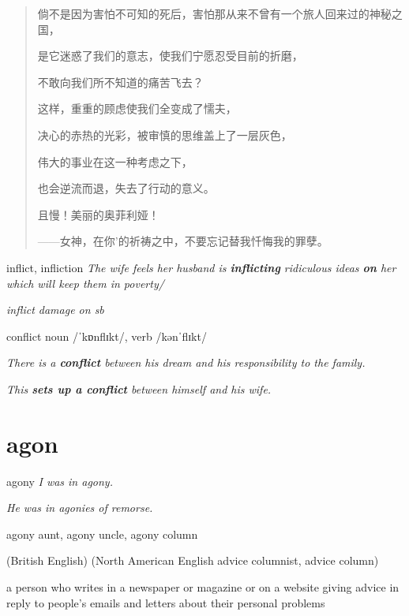 \begin{quotation}
    倘不是因为害怕不可知的死后，害怕那从来不曾有一个旅人回来过的神秘之国，

    是它迷惑了我们的意志，使我们宁愿忍受目前的折磨，

    不敢向我们所不知道的痛苦飞去？

    这样，重重的顾虑使我们全变成了懦夫，

    决心的赤热的光彩，被审慎的思维盖上了一层灰色，

    伟大的事业在这一种考虑之下，

    也会逆流而退，失去了行动的意义。

    且慢！美丽的奥菲利娅！

    ——女神，在你'的祈祷之中，不要忘记替我忏悔我的罪孽。
\end{quotation}

\begin{DefWord}{inflict, infliction}
    \textit{The wife feels her husband is \textbf{inflicting} ridiculous ideas \textbf{on} her which will keep them in poverty/}

    \textit{inflict damage on sb}
\end{DefWord}

\begin{DefWord}{conflict}
    noun /ˈkɒnflɪkt/, verb /kənˈflɪkt/

    \textit{There is a \textbf{conflict} between his dream and his responsibility to the family.}

    \textit{This \textbf{sets up a conflict }between himself and his wife.}
\end{DefWord}


\section{agon}

\begin{DefWord}{agony}
    \textit{I was in agony.}

    \textit{ He was in agonies of remorse.}
\end{DefWord}

\begin{DefWord}{agony aunt, agony uncle, agony column}
\end{DefWord}
(British English)
(North American English advice columnist, advice column)

a person who writes in a newspaper or magazine or on a website giving advice in reply to people's emails and letters about their personal problems

